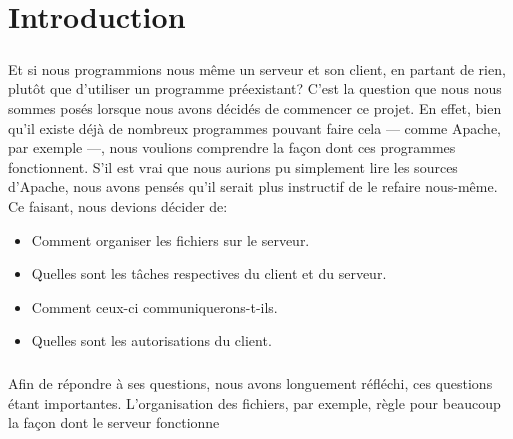 \documentclass[12pt,a4paper,twoside]{article}
\begin{document}
	\maketitle{}
	\renewcommand{\contentsname}{Sommaire} %
	\tableofcontents{}
	\newpage{}
	\section{Introduction} %
		\subparagraph*{}
			Et si nous programmions nous même un serveur et son client, en partant de rien, plutôt que d'utiliser un programme préexistant? C'est la question que nous nous sommes posés lorsque nous avons décidés de commencer ce projet. En effet, bien qu'il existe déjà de nombreux programmes pouvant faire cela — comme Apache, par exemple —, nous voulions comprendre la façon dont ces programmes fonctionnent. S'il est vrai que nous aurions pu simplement lire les sources d'Apache, nous avons pensés qu'il serait plus instructif de le refaire nous-même. Ce faisant, nous devions décider de:
			\begin{itemize}
				\item{} Comment organiser les fichiers sur le serveur.
				\item{} Quelles sont les tâches respectives du client et du serveur.
				\item{} Comment ceux-ci communiquerons-t-ils.
				\item{} Quelles sont les autorisations du client.
			\end{itemize}
		\subparagraph*{}
			Afin de répondre à ses questions, nous avons longuement réfléchi, ces questions étant importantes. L'organisation des fichiers, par exemple, règle pour beaucoup la façon dont le serveur fonctionne
\end{document}
